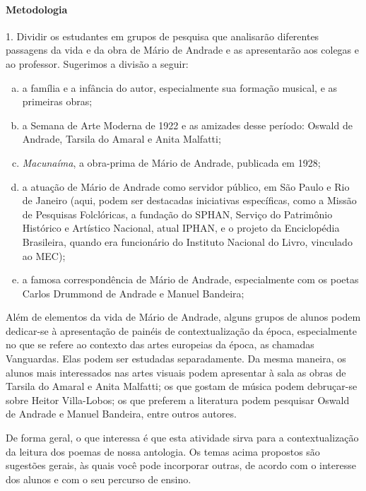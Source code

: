 \documentclass[11pt]{extarticle}
\begin{document}
\paragraph{Metodologia}


1. Dividir os estudantes em grupos de pesquisa que analisarão diferentes
passagens da vida e da obra de Mário de Andrade e as apresentarão aos
colegas e ao professor. Sugerimos a divisão a seguir:

\begin{enumerate}[(a)]
\item a família e a infância do autor, especialmente sua formação musical,
e as primeiras obras;

\item a Semana de Arte Moderna de 1922 e as amizades desse período: Oswald
de Andrade, Tarsila do Amaral e Anita Malfatti;

\item \emph{Macunaíma}, a obra-prima de Mário de Andrade, publicada em
1928;

\item a atuação de Mário de Andrade como servidor público, em São Paulo e
Rio de Janeiro (aqui, podem ser destacadas iniciativas específicas, como
a Missão de Pesquisas Folclóricas, a fundação do SPHAN, Serviço do
Patrimônio Histórico e Artístico Nacional, atual IPHAN, e o projeto da
Enciclopédia Brasileira, quando era funcionário do Instituto Nacional do
Livro, vinculado ao MEC);

\item a famosa correspondência de Mário de Andrade, especialmente com os
poetas Carlos Drummond de Andrade e Manuel Bandeira;
\end{enumerate}

Além de elementos da vida de Mário de Andrade, alguns grupos de alunos
podem dedicar-se à apresentação de painéis de contextualização da época,
especialmente no que se refere ao contexto das artes europeias da época,
as chamadas Vanguardas. Elas podem ser estudadas separadamente. Da mesma
maneira, os alunos mais interessados nas artes visuais podem apresentar
à sala as obras de Tarsila do Amaral e Anita Malfatti; os que gostam de
música podem debruçar-se sobre Heitor Villa-Lobos; os que preferem a
literatura podem pesquisar Oswald de Andrade e Manuel Bandeira, entre
outros autores.

De forma geral, o que interessa é que esta atividade sirva para a
contextualização da leitura dos poemas de nossa antologia. Os temas
acima propostos são sugestões gerais, às quais você pode incorporar
outras, de acordo com o interesse dos alunos e com o seu percurso de
ensino.
\end{document}
